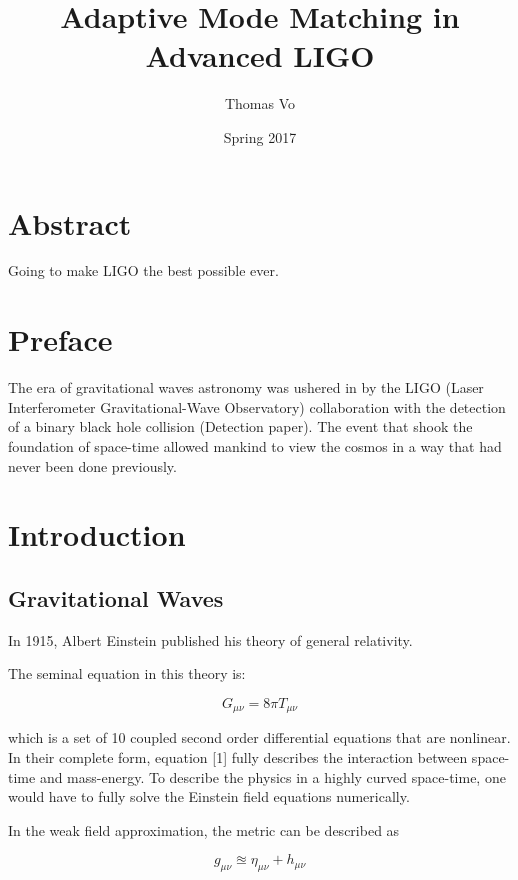 \documentclass[oneside]{book}
\title{Adaptive Mode Matching in Advanced LIGO}
\date{Spring 2017}
\author{Thomas Vo}
\begin{document}
	
\doublespacing
		\chapter*{Abstract}
		Going to make LIGO the best possible ever.
	
	\maketitle
		\chapter*{Preface}
		The era of gravitational waves astronomy was ushered in by the LIGO (Laser Interferometer Gravitational-Wave Observatory) collaboration with the detection of a binary black hole collision (Detection paper).  The event that shook the foundation of space-time allowed mankind to view the cosmos in a way that had never been done previously. 
	\tableofcontents

\chapter{Introduction}

	\section{Gravitational Waves}\label{gravitational waves}
	In 1915, Albert Einstein published his theory of general relativity.
	
	The seminal equation in this theory is:
	
	\begin{equation} \label{einstein}
	G_{\mu \nu} = 8 \pi T_{\mu \nu}
	\end{equation}
	
	which is a set of 10 coupled second order differential equations that are nonlinear.  In their complete form, equation [1] fully describes the interaction between space-time and mass-energy. To describe the physics in a highly curved space-time, one would have to fully solve the Einstein field equations numerically.  
	
	
	In the weak field approximation, the metric can be described as
	
	\begin{equation} \label{weak}
	g_{\mu \nu}  \approxeq \eta_{\mu \nu} + h_{\mu \nu}
	\end{equation}
	
\end{document}
